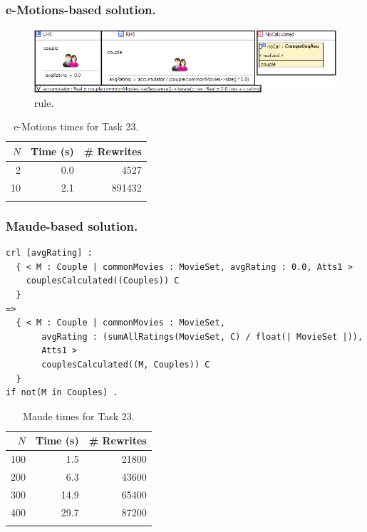 
\subsubsection{e-Motions-based solution.}

\begin{figure}[htp]
  \centering
  \includegraphics[width=\textwidth]{imgs/computingAvgRating}
  \caption{ rule.}\label{fig:computingAvgRating}
\end{figure}

\begin{table}
  \begin{center}
	\begin{tabular}{r r r}
	$N$ & Time (s) & \# Rewrites \\
	\hline
	2 & 0.0 & 4527 \\
	10 & 2.1 & 891432 \\
	\hline \\
	\end{tabular}
	\caption{e-Motions times for Task 23.}\label{table:emotionstask3}
	\end{center}
\end{table}

\subsubsection{Maude-based solution.}

\begin{lstlisting}[caption=Maude rule for Task 3 solution., label=lst:task3]
crl [avgRating] :
  { < M : Couple | commonMovies : MovieSet, avgRating : 0.0, Atts1 >
    couplesCalculated((Couples)) C 
  }
=>
  { < M : Couple | commonMovies : MovieSet, 
       avgRating : (sumAllRatings(MovieSet, C) / float(| MovieSet |)),
       Atts1 >
       couplesCalculated((M, Couples)) C
  }
if not(M in Couples) .
\end{lstlisting}

\begin{table}
  \begin{center}
	\begin{tabular}{r r r}
	$N$ & Time (s) & \# Rewrites \\
	\hline
	100 & 1.5 & 21800 \\
	200 & 6.3 & 43600 \\
	300 & 14.9 & 65400 \\
	400 & 29.7 & 87200 \\
	\hline \\
	\end{tabular}
	\caption{Maude times for Task 23.}\label{table:maudetask3}
	\end{center}
\end{table}